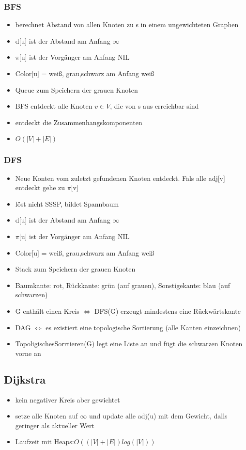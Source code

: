 \documentclass{article}
\begin{document}
\subsubsection{BFS}
\begin{itemize}
\item berechnet Abstand von allen Knoten zu s in einem ungewichteten Graphen
\item d[u] ist der Abstand am Anfang $\infty$
\item $\pi$[u] ist der Vorgänger am Anfang NIL
\item Color[u] = weiß, grau,schwarz am Anfang weiß
\item Queue zum Speichern der grauen Knoten
\item BFS entdeckt alle Knoten $v\in V$, die von s aus erreichbar sind
\item entdeckt die Zusammenhangskomponenten
\item $O(|V|+|E|)$
\end{itemize}

\subsubsection{DFS}
\begin{itemize}
\item Neue Konten vom zuletzt gefundenen Knoten entdeckt. Fals alle adj[v] entdeckt gehe zu $\pi$[v]
\item löst nicht SSSP, bildet Spannbaum
\item d[u] ist der Abstand am Anfang $\infty$
\item $\pi$[u] ist der Vorgänger am Anfang NIL
\item Color[u] = weiß, grau,schwarz am Anfang weiß
\item Stack zum Speichern der grauen Knoten
\item Baumkante: rot, Rückkante: grün (auf grauen), Sonstigekante: blau (auf schwarzen)
\item G enthält einen Kreis $\Leftrightarrow$ DFS(G) erzeugt mindestens eine Rückwärtskante
\item DAG $\Leftrightarrow$ es existiert eine topologische Sortierung (alle Kanten einzeichnen)
\item TopoligischesSorrtieren(G) legt eine Liste an und fügt die schwarzen Knoten vorne an
\end{itemize}

\subsection{Dijkstra}
\begin{itemize}
\item kein negativer Kreis aber gewichtet
\item setze alle Knoten auf $\infty$ und update alle adj(u) mit dem Gewicht, dalls geringer als aktueller Wert
\item Laufzeit mit Heaps:$O((|V|+|E|)log(|V|))$
\end{itemize}
\end{document}

